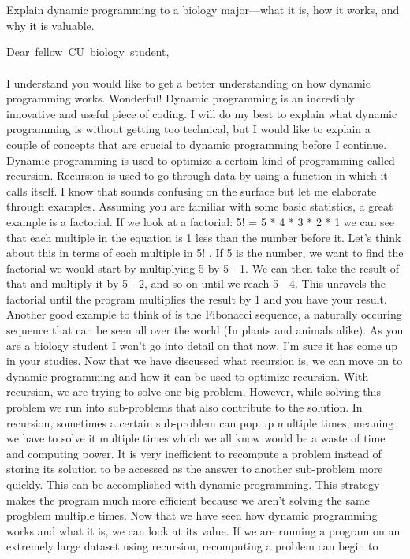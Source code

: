 \documentclass[12pt]{article}
\begin{document}
\renewcommand{\headrulewidth}{0.5pt}

\phantom{Test}
\\ \\ Explain dynamic programming to a biology major---what it is, how it works, and why it is valuable.

\pagebreak

\newpage
\mbox{Dear fellow CU biology student,}
\\ \\ I understand you would like to get a better understanding on how dynamic programming works. Wonderful! Dynamic programming is an incredibly innovative and useful piece of coding. I will do my best to explain what dynamic programming is without getting too technical, but I would like to explain a couple of concepts that are crucial to dynamic programming before I continue. Dynamic programming is used to optimize a certain kind of programming called recursion. Recursion is used to go through data by using a function in which it calls itself. I know that sounds confusing on the surface but let me elaborate through examples. Assuming you are familiar with some basic statistics, a great example is a factorial. If we look at a factorial: 5! = 5 * 4 * 3 * 2 * 1 we can see that each multiple in the equation is 1 less than the number before it. Let's think about this in terms of each multiple in 5! . If 5 is the number, we want to find the factorial we would start by multiplying 5 by 5 - 1. We can then take the result of that and multiply it by 5 - 2, and so on until we reach 5 - 4. This unravels the factorial until the program multiplies the result by 1 and you have your result. Another good example to think of is the Fibonacci sequence, a naturally occuring sequence that can be seen all over the world (In plants and animals alike). As you are a biology student I won't go into detail on that now, I'm sure it has come up in your studies. Now that we have discussed what recursion is, we can move on to dynamic programming and how it can be used to optimize recursion. With recursion, we are trying to solve one big problem. However, while solving this problem we run into sub-problems that also contribute to the solution. In recursion, sometimes a certain sub-problem can pop up multiple times, meaning we have to solve it multiple times which we all know would be a waste of time and computing power. It is very inefficient to recompute a problem instead of storing its solution to be accessed as the answer to another sub-problem more quickly. This can be accomplished with dynamic programming. This strategy makes the program much more efficient because we aren't solving the same progblem multiple times. Now that we have seen how dynamic programming works and what it is, we can look at its value. If we are running a program on an extremely large dataset using recursion, recomputing a problem can begin to 
\end{document}
